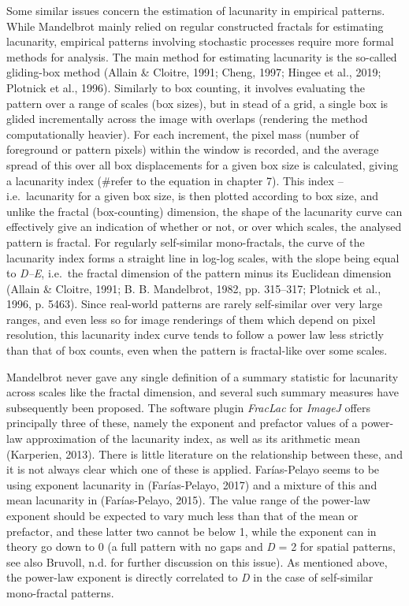 \documentclass[
  12pt,
]{book}
\begin{document}
Some similar issues concern the estimation of lacunarity in empirical patterns. While Mandelbrot mainly relied on regular constructed fractals for estimating lacunarity, empirical patterns involving stochastic processes require more formal methods for analysis. The main method for estimating lacunarity is the so-called gliding-box method (Allain \& Cloitre, 1991; Cheng, 1997; Hingee et al., 2019; Plotnick et al., 1996). Similarly to box counting, it involves evaluating the pattern over a range of scales (box sizes), but in stead of a grid, a single box is glided incrementally across the image with overlaps (rendering the method computationally heavier). For each increment, the pixel mass (number of foreground or pattern pixels) within the window is recorded, and the average spread of this over all box displacements for a given box size is calculated, giving a lacunarity index (\#refer to the equation in chapter 7). This index -- i.e.~lacunarity for a given box size, is then plotted according to box size, and unlike the fractal (box-counting) dimension, the shape of the lacunarity curve can effectively give an indication of whether or not, or over which scales, the analysed pattern is fractal. For regularly self-similar mono-fractals, the curve of the lacunarity index forms a straight line in log-log scales, with the slope being equal to \emph{D--E}, i.e.~the fractal dimension of the pattern minus its Euclidean dimension (Allain \& Cloitre, 1991; B. B. Mandelbrot, 1982, pp. 315--317; Plotnick et al., 1996, p. 5463). Since real-world patterns are rarely self-similar over very large ranges, and even less so for image renderings of them which depend on pixel resolution, this lacunarity index curve tends to follow a power law less strictly than that of box counts, even when the pattern is fractal-like over some scales.

Mandelbrot never gave any single definition of a summary statistic for lacunarity across scales like the fractal dimension, and several such summary measures have subsequently been proposed. The software plugin \emph{FracLac} for \emph{ImageJ} offers principally three of these, namely the exponent and prefactor values of a power-law approximation of the lacunarity index, as well as its arithmetic mean (Karperien, 2013). There is little literature on the relationship between these, and it is not always clear which one of these is applied. Farías-Pelayo seems to be using exponent lacunarity in (Farías-Pelayo, 2017) and a mixture of this and mean lacunarity in (Farías-Pelayo, 2015). The value range of the power-law exponent should be expected to vary much less than that of the mean or prefactor, and these latter two cannot be below 1, while the exponent can in theory go down to 0 (a full pattern with no gaps and \emph{D} = 2 for spatial patterns, see also Bruvoll, n.d. for further discussion on this issue). As mentioned above, the power-law exponent is directly correlated to \emph{D} in the case of self-similar mono-fractal patterns.
\end{document}
